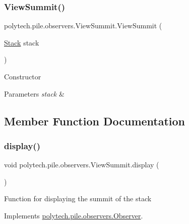 \subsubsection{\texorpdfstring{View\+Summit()}{ViewSummit()}}
{\footnotesize\ttfamily polytech.\+pile.\+observers.\+View\+Summit.\+View\+Summit (\begin{DoxyParamCaption}\item[{\hyperlink{classpolytech_1_1pile_1_1subject_1_1_stack}{Stack}}]{stack }\end{DoxyParamCaption})}

Constructor


\begin{DoxyParams}{Parameters}
{\em stack} & \\
\hline
\end{DoxyParams}


\subsection{Member Function Documentation}
\hypertarget{classpolytech_1_1pile_1_1observers_1_1_view_summit_a5906b18ace7f7c8ada6b7d396fe48f1d}{}\label{classpolytech_1_1pile_1_1observers_1_1_view_summit_a5906b18ace7f7c8ada6b7d396fe48f1d} 
\subsubsection{\texorpdfstring{display()}{display()}}
{\footnotesize\ttfamily void polytech.\+pile.\+observers.\+View\+Summit.\+display (\begin{DoxyParamCaption}{ }\end{DoxyParamCaption})}

Function for displaying the summit of the stack 

Implements \hyperlink{interfacepolytech_1_1pile_1_1observers_1_1_observer_a9a2e7784e992cb25888fdb22660f542c}{polytech.\+pile.\+observers.\+Observer}.

\hypertarget{classpolytech_1_1pile_1_1observers_1_1_view_summit_a4d486c1e5589b2cba84ea9fee25befb5}{}\label{classpolytech_1_1pile_1_1observers_1_1_view_summit_a4d486c1e5589b2cba84ea9fee25befb5} 
